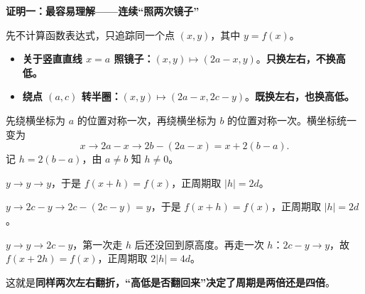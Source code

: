\clearpage
\begin{proofbox}
\textbf{\textcolor{CProof}{证明一：最容易理解——连续“照两次镜子”}}



先不计算函数表达式，只追踪同一个点 $(x,y)$，其中 $y=f(x)$。
\begin{itemize}[leftmargin=*,itemsep=0.4em]
\item \textbf{关于竖直直线 $x=a$ 照镜子：}$(x,y)\mapsto(2a-x,y)$。\textbf{只换左右，不换高低。}
\item \textbf{绕点 $(a,c)$ 转半圈：}$(x,y)\mapsto(2a-x,2c-y)$。\textbf{既换左右，也换高低。}
\end{itemize}

先绕横坐标为 $a$ 的位置对称一次，再绕横坐标为 $b$ 的位置对称一次。横坐标统一变为
\[
 x\to2a-x\to2b-(2a-x)=x+2(b-a).
\]
记 $h=2(b-a)$，由 $a\neq b$ 知 $h\neq0$。

\begin{description}[style=nextline,leftmargin=2.2em,itemsep=0.4em]
\item[\textbf{轴轴：}] $y\to y\to y$，于是 $f(x+h)=f(x)$，正周期取 $|h|=2d$。
\item[\textbf{点点：}] $y\to 2c-y\to2c-(2c-y)=y$，于是 $f(x+h)=f(x)$，正周期取 $|h|=2d$。
\item[\textbf{轴点：}] $y\to y\to2c-y$，第一次走 $h$ 后还没回到原高度。再走一次 $h$：$2c-y\to y$，故 $f(x+2h)=f(x)$，正周期取 $2|h|=4d$。
\end{description}

这就是\textbf{同样两次左右翻折，“高低是否翻回来”决定了周期是两倍还是四倍}。

\medskip

\end{proofbox}
\clearpage
